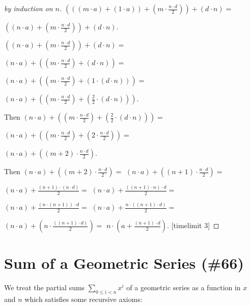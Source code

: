 \documentclass{article}
\begin{document}
\begin{forthel}
\begin{proof}[by induction on $n$]
$(((m \cdot a) + (1 \cdot a)) +  (m \cdot \frac{n \cdot d}{2})) + (d \cdot n) =$

$((n \cdot a) +  (m \cdot \frac{n \cdot d}{2})) + (d \cdot n)$.

$((n \cdot a) +  (m \cdot \frac{n \cdot d}{2})) + (d \cdot n) =$

$(n \cdot a) +  ((m \cdot \frac{n \cdot d}{2}) + (d \cdot n))=$

$(n \cdot a) +  ((m \cdot \frac{n \cdot d}{2}) + (1 \cdot (d \cdot n)))=$

$(n \cdot a) +  ((m \cdot \frac{n \cdot d}{2}) + (\frac{2}{2} \cdot (d \cdot n)))$.

Then $(n \cdot a) +  ((m \cdot \frac{n \cdot d}{2}) + (\frac{2}{2} \cdot (d \cdot n))) =$

$(n \cdot a) +  ((m \cdot \frac{n \cdot d}{2}) + (2 \cdot \frac{n \cdot d}{2})) =$

$(n \cdot a) +  ((m +2) \cdot \frac{n \cdot d}{2})$.

Then $(n \cdot a) + ((m +2) \cdot \frac{n \cdot d}{2}) =$
$(n \cdot a) +  ((n+1) \cdot \frac{n \cdot d}{2}) =$

$(n \cdot a) +  \frac{(n+1) \cdot (n \cdot d)}{2} =$
$(n \cdot a) +  \frac{((n+1) \cdot n) \cdot d}{2} =$

$(n \cdot a) +  \frac{(n \cdot (n+1)) \cdot d}{2} =$
$(n \cdot a) +  \frac{n \cdot ((n+1) \cdot d)}{2} =$

$(n \cdot a) +  (n \cdot \frac{((n+1) \cdot d)}{2}) =$
$n \cdot ( a + \frac{(n + 1) \cdot d}{2})$.
[timelimit 3]
\end{proof}
\end{forthel}


\section{Sum of a Geometric Series (\#66)}

\newcommand{\sumgeom}[2]{\sum_{0 \leq i < #2} {#1}^i}


We treat the partial sums $\sumgeom{x}{n}$ of a geometric
series as a function in $x$ and $n$ which satisfies some
recursive axioms:
\end{document}

